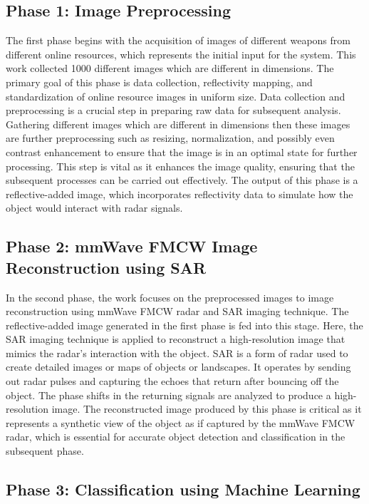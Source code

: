 \documentclass[journal,article,submit,pdftex,moreauthors]{Definitions/mdpi}
\begin{document}
\subsection*{Phase 1: Image Preprocessing}

The first phase begins with the acquisition of images of different weapons from different online resources, which represents the initial input for the system. This work collected 1000 different images which are different in dimensions. The primary goal of this phase is data collection, reflectivity mapping, and standardization of online resource images in uniform size. Data collection and preprocessing is a crucial step in preparing raw data for subsequent analysis. Gathering different images which are different in dimensions then these images are further preprocessing such as resizing, normalization, and possibly even contrast enhancement to ensure that the image is in an optimal state for further processing. This step is vital as it enhances the image quality, ensuring that the subsequent processes can be carried out effectively. The output of this phase is a reflective-added image, which incorporates reflectivity data to simulate how the object would interact with radar signals.

\subsection*{Phase 2: mmWave FMCW Image Reconstruction using SAR}

In the second phase, the work focuses on the preprocessed images to image reconstruction using mmWave FMCW radar and SAR imaging technique. The reflective-added image generated in the first phase is fed into this stage. Here, the SAR imaging technique is applied to reconstruct a high-resolution image that mimics the radar's interaction with the object. SAR is a form of radar used to create detailed images or maps of objects or landscapes. It operates by sending out radar pulses and capturing the echoes that return after bouncing off the object. The phase shifts in the returning signals are analyzed to produce a high-resolution image. The reconstructed image produced by this phase is critical as it represents a synthetic view of the object as if captured by the mmWave FMCW radar, which is essential for accurate object detection and classification in the subsequent phase.

\subsection*{Phase 3: Classification using Machine Learning}
\end{document}
